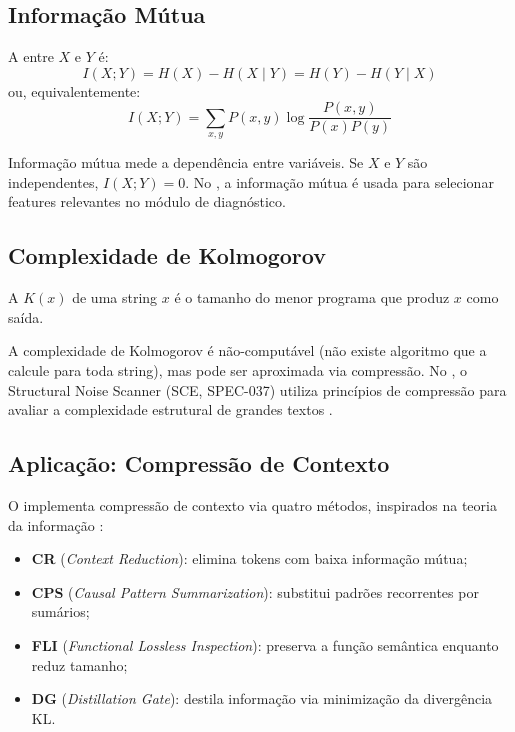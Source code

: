\subsection{Informação Mútua}

\begin{definicao}
    A  entre $X$ e $Y$ é:
    \[
    I(X; Y) = H(X) - H(X \mid Y) = H(Y) - H(Y \mid X)
    \]
    ou, equivalentemente:
    \[
    I(X; Y) = \sum_{x,y} P(x,y) \log \frac{P(x,y)}{P(x)P(y)}
    \]
\end{definicao}

\begin{observacao}
    Informação mútua mede a dependência entre variáveis. Se $X$ e $Y$ são
    independentes, $I(X; Y) = 0$. No \opencodeeco{}, a informação mútua é
    usada para selecionar features relevantes no módulo de diagnóstico.
\end{observacao}

\subsection{Complexidade de Kolmogorov}

\begin{definicao}
    A  $K(x)$ de uma string $x$ é o
    tamanho do menor programa que produz $x$ como saída.
\end{definicao}

\begin{observacao}
    A complexidade de Kolmogorov é não-computável (não existe algoritmo que
    a calcule para toda string), mas pode ser aproximada via compressão. No
    \opencodeeco{}, o Structural Noise Scanner (SCE, SPEC-037) utiliza
    princípios de compressão para avaliar a complexidade estrutural de
    grandes textos \cite{opencode2026spec036, opencode2026ecosystem}.
\end{observacao}

\subsection{Aplicação: Compressão de Contexto}

O \opencodeeco{} implementa compressão de contexto via quatro métodos,
inspirados na teoria da informação \cite{cover2006elements}:
\begin{itemize}
    \item \textbf{CR} (\textit{Context Reduction}): elimina tokens com baixa
          informação mútua;
    \item \textbf{CPS} (\textit{Causal Pattern Summarization}): substitui
          padrões recorrentes por sumários;
    \item \textbf{FLI} (\textit{Functional Lossless Inspection}): preserva
          a função semântica enquanto reduz tamanho;
    \item \textbf{DG} (\textit{Distillation Gate}): destila informação via
          minimização da divergência KL.
\end{itemize}

